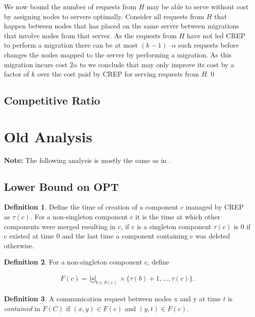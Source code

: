 \documentclass[xcolor=dvipsnames, tikz, 12pt]{article}
\newcommand{\nl}{\newline}
\newcommand{\crep}{C{\scriptsize REP}}
\newcommand{\opt}{\text{O{\scriptsize PT}}}
\theoremstyle{definition}
\newtheorem{defi}{Definition}
\begin{document}
We now bound the number of requests from $H$ \opt{} may be able to serve without cost by assigning nodes to servers optimally. Consider all requests from $H$ that happen between nodes that \opt{} has placed on the same server between \opt{} migrations that involve nodes from that server. As the requests from $H$ have not led \crep{} to perform a migration there can be at most $(k-1)\cdot\alpha$ such requests before \opt{} changes the nodes mapped to the server by performing a migration. As this migration incurs cost $2\alpha$ to \opt{} we conclude that \opt{} may only improve its cost by a factor of $k$ over the cost paid by \crep{} for serving requests from $H$.\qed\nl

\subsection{Competitive Ratio}



\section{Old Analysis}
\textbf{Note:} The following analysis is mostly the same as in \cite{Avin2015}.	

	\subsection{Lower Bound on OPT}
	\begin{defi}
		Define the time of creation of a component $c$ managed by \crep{} as $\tau(c)$. For a non-singleton component c it is the time at which other components were merged resulting in c, if c is a singleton component $\tau(c)$ is 0 if c existed at time 0 and the last time a component containing c was deleted otherwise.
	\end{defi}
	\begin{defi}
		For a non-singleton component $c$, define
	\end{defi}
	\begin{align*}
	F(c)=\biguplus_{b\in S(c)}\times \{\tau(b)+1,...,\tau(c)\}.
	\end{align*}
	
	\begin{defi}
		A communication request between nodes x and y at time $t$ is \textit{contained} in $F(C)$ if $(x,y)\in F(c)$ and $(y,t)\in F(c)$.
	\end{defi}
\end{document}
